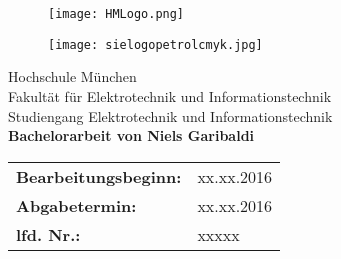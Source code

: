 \begin{titlepage}
	\begin{figure}[h]
		 
		\begin{minipage}{0.45\linewidth} 
			\raggedright 
			\texttt{[image: HMLogo.png]} 
		\end{minipage} 
		\begin{minipage}{0.45\linewidth} 
			\raggedleft
			\vspace*{1 cm} 
			\texttt{[image: sielogopetrolcmyk.jpg]} 
		\end{minipage} 
	\end{figure}
	\begin{center} 
		\vspace{1.5 cm} {\LARGE Hochschule München} \\ 
		\vspace{1 cm} {\LARGE Fakultät für Elektrotechnik und Informationstechnik} \\ 
		\vspace{2 cm} {\Large Studiengang Elektrotechnik und Informationstechnik} \\ 
		\vspace*{2 cm}{\Huge \bf Industrie 4.0 - Pathfinding auf einer SPS\\} 
		\vspace{2 cm}
		{\bf Bachelorarbeit von Niels Garibaldi}\\
	\end{center}
	\vspace{4 cm}
	\begin{center}
		
		\begin{tabular}{ll}
			
			{\bf Bearbeitungsbeginn:} & xx.xx.2016\\
			{\bf Abgabetermin:} & xx.xx.2016\\
			{\bf lfd. Nr.:} & xxxxx\\
		\end{tabular}
	\end{center}

\end{titlepage} 

